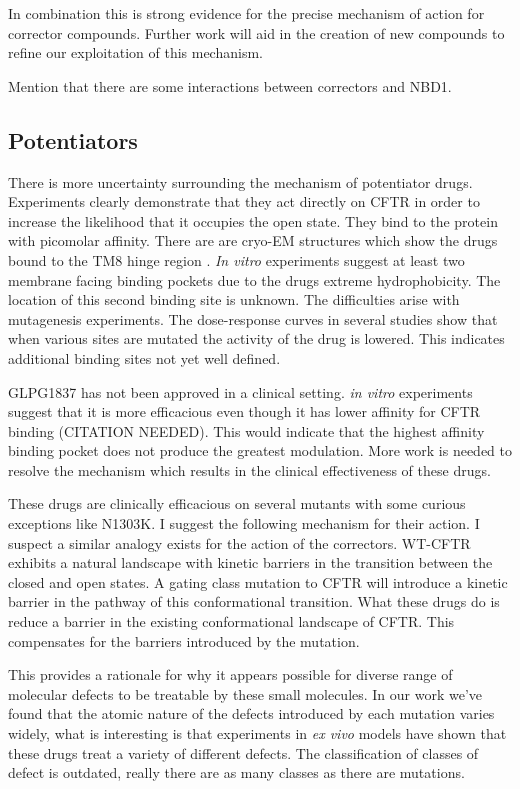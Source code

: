 In combination this is strong evidence for the precise mechanism of action for corrector compounds. Further work will aid in the creation of new compounds to refine our exploitation of this mechanism.

Mention that there are some interactions between correctors and NBD1.

\subsection{Potentiators}
There is more uncertainty surrounding the mechanism of potentiator drugs. Experiments clearly demonstrate that they act directly on CFTR in order to increase the likelihood that it occupies the open state. They bind to the protein with picomolar affinity. There are are cryo-EM structures which show the drugs bound to the TM8 hinge region \cite{}. \textit {In vitro} experiments suggest at least two membrane facing binding pockets due to the drugs extreme hydrophobicity\cite{}. The location of this second binding site is unknown. The difficulties arise with mutagenesis experiments. The dose-response curves in several studies show that when various sites are mutated the activity of the drug is lowered. This indicates additional binding sites not yet well defined. 

GLPG1837 has not been approved in a clinical setting. \textit {in vitro} experiments suggest that it is more efficacious even though it has lower affinity for CFTR binding (CITATION NEEDED). This would indicate that the highest affinity binding pocket does not produce the greatest modulation. More work is needed to resolve the mechanism which results in the clinical effectiveness of these drugs.  

These drugs are clinically efficacious \cite{VanGoor2014} on several mutants with some curious exceptions like N1303K. I suggest the following mechanism for their action. I suspect a similar analogy exists for the action of the correctors. WT-CFTR exhibits a natural landscape with kinetic barriers in the transition between the closed and open states. A gating class mutation to CFTR will introduce a kinetic barrier in the pathway of this conformational transition. What these drugs do is reduce a barrier in the existing conformational landscape of CFTR. This compensates for the barriers introduced by the mutation. 

This provides a rationale for why it appears possible for diverse range of molecular defects to be treatable by these small molecules. In our work we've found that the atomic nature of the defects introduced by each mutation varies widely, what is interesting is that experiments in \textit{ex vivo} models have shown that these drugs treat a variety of different defects. The classification of classes of defect is outdated, really there are as many classes as there are mutations.


